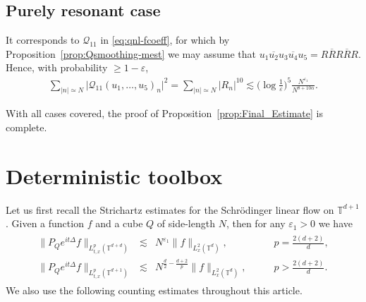 \documentclass[11pt, xcolor = dvipsnames,reqno
]{amsart}
\theoremstyle{definition}
\theoremstyle{remark}
\begin{document}
    \subsection{Purely resonant case}
    It corresponds to $\mathcal Q_{11}$ in \eqref{eq:qnl-fcoeff}, for which by Proposition~\ref{prop:Qsmoothing-mest} we may assume that $u_1 \overline{u_2} u_3 \overline{ u_4} u_5 = R \overline R R \overline R R$. Hence, with probability $\geq 1 - \varepsilon$,
    \begin{align}
        \sum_{|n| \simeq N}  \big| \mathcal{Q}_{11}(u_1, \ldots, u_5)_n \big|^2
        = \sum_{|n| \simeq N} |R_n|^{10}        
        \lesssim  \Big( \log \frac{1}{\varepsilon} \Big)^5 \frac{N^{\varepsilon_1}}{N^{8 + 10\alpha}}.
    \end{align} 
    
    With all cases covered, the proof of Proposition~\ref{prop:Final_Estimate} is complete. 



    

    \appendix


    \section{Deterministic toolbox}
    \label{app:Deterministic}
    
    Let us first recall the Strichartz estimates for the Schrödinger linear flow on $\mathbb{T}^{d+1}$. 
    Given a function $f$ and a cube $Q$ of side-length $N$, then for any $\varepsilon_1 > 0$ we have
    \begin{align}\label{eq:strichartz}
    \begin{array}{rlll}
        \| P_Q e^{it\Delta}f\|_{L^p_{t,x}(\mathbb{T}^{d+d})} 
        & \lesssim 
        & N^{\varepsilon_1}\|f\|_{L^2_x(\mathbb{T}^d)}, 
        & \qquad p = \frac{2(d+2)}{d}, \\
        \| P_Q e^{it\Delta}f\|_{L^p_{t,x}(\mathbb{T}^{d+1})} 
        & \lesssim 
        & N^{\frac{d}{2} - \frac{d+2}{p}} \|f\|_{L^2_x(\mathbb{T}^d)}, 
        & \qquad p > \frac{2(d+2)}{d}.
    \end{array}
    \end{align}
%
We also use the following counting estimates throughout this article. 
\end{document}
